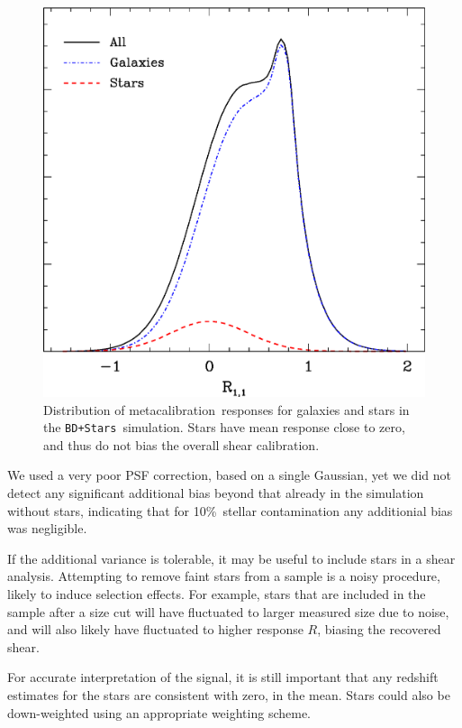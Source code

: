 \documentclass[usegraphicx,usenatbib]{mn2e}
\newcommand{\mcal}{metacalibration}
\newcommand{\mcalR}{$R$}
\newcommand{\nsimNstarperc}{10\%}
\newcommand{\bdstar}{\texttt{BD+Stars}}
\begin{document}
\begin{figure}
    \centering
    \includegraphics[scale=0.45]{R-bd29-bd29stars.eps}

    \caption{Distribution of \mcal\ responses for galaxies and stars in
    the \bdstar\ simulation.  Stars have mean response close to zero,
    and thus do not bias the overall shear calibration.}

\label{fig:Rstars}
\end{figure}

We used a very poor PSF correction, based on a single Gaussian, yet we did not
detect any significant additional bias beyond that already in the simulation
without stars, indicating that for \nsimNstarperc\ stellar contamination
any additionial bias was negligible.

If the
additional variance is tolerable, it may be useful to include stars in a shear
analysis.  Attempting to remove faint stars from a sample is a noisy procedure,
likely to induce selection effects. For example, stars that are included in the
sample after a size cut will have fluctuated to larger measured size due to
noise, and will also likely have fluctuated to higher response \mcalR, biasing
the recovered shear.

For accurate interpretation of the signal, it is still important that any
redshift estimates for the stars are consistent with zero, in the mean.  Stars
could also be down-weighted using an appropriate weighting scheme.
\end{document}
